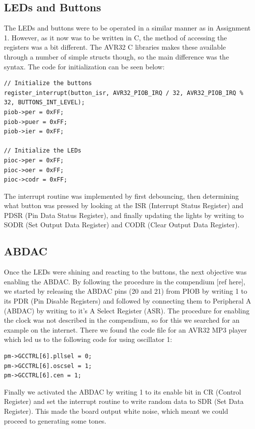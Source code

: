 \documentclass[a4paper,12pt]{article}
\begin{document}
\subsection{LEDs and Buttons}
The LEDs and buttons were to be operated in a similar manner as in Assignment 1. However, as it now was to be written in C, the method of accessing the registers was a bit different. The AVR32 C libraries makes these available through a number of simple structs though, so the main difference was the syntax. The code for initialization can be seen below:

\begin{verbatim}
// Initialize the buttons
register_interrupt(button_isr, AVR32_PIOB_IRQ / 32, AVR32_PIOB_IRQ % 32, BUTTONS_INT_LEVEL);
piob->per = 0xFF;
piob->puer = 0xFF;
piob->ier = 0xFF;

// Initialize the LEDs
pioc->per = 0xFF;
pioc->oer = 0xFF;
pioc->codr = 0xFF;
\end{verbatim}

The interrupt routine was implemented by first debouncing, then determining what button was pressed by looking at the ISR (Interrupt Status Register) and PDSR (Pin Data Status Register), and finally updating the lights by writing to SODR (Set Output Data Register) and CODR (Clear Output Data Register).

\subsection{ABDAC}
Once the LEDs were shining and reacting to the buttons, the next objective was enabling the ABDAC. By following the procedure in the compendium [ref here], we started by releasing the
ABDAC pins (20 and 21) from PIOB by writing 1 to its PDR (Pin Disable Registers) and followed by connecting them to Peripheral A (ABDAC) by writing to it’s A Select Register (ASR). The procedure for enabling the clock was not described in the compendium, so for this we searched for an example on the internet. There we found the code file for an AVR32 MP3 player \cite{clockex} which led us to the following code for using oscillator 1:

\begin{verbatim}
pm->GCCTRL[6].pllsel = 0;
pm->GCCTRL[6].oscsel = 1;
pm->GCCTRL[6].cen = 1;
\end{verbatim}

Finally we activated the ABDAC by writing 1 to its enable bit in CR (Control Register) and set the interrupt routine to write random data to SDR (Set Data Register). This made the board output white noise, which meant we could proceed to generating some tones.
\end{document}
